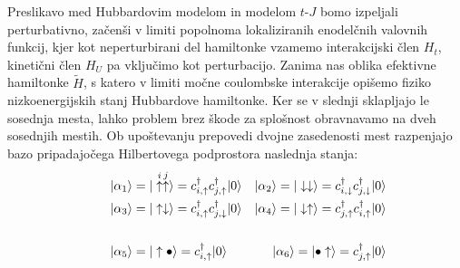 \begin{appendices}
Preslikavo med Hubbardovim modelom in modelom $t$-$J$ bomo izpeljali perturbativno, začenši v limiti popolnoma lokaliziranih enodelčnih valovnih funkcij, kjer kot neperturbirani del hamiltonke vzamemo interakcijski člen $H_t$, kinetični člen $H_U$ pa vključimo kot perturbacijo. Zanima nas oblika efektivne hamiltonke $\tilde{H}$, s katero v limiti močne coulombske interakcije opišemo fiziko nizkoenergijskih stanj Hubbardove hamiltonke. Ker se v slednji sklapljajo le sosednja mesta, lahko problem brez škode za splošnost obravnavamo na dveh sosednjih mestih. Ob upoštevanju prepovedi dvojne zasedenosti mest razpenjajo bazo pripadajočega Hilbertovega podprostora naslednja stanja:
\begin{equation}\label{eq:stanja}
\begin{aligned}\qquad
&\ket{\alpha_1}= \ket{  \overset{i}{\uparrow} \overset{j}{\uparrow}}=c^\dagger_{i,\uparrow}c^\dagger_{j,\uparrow}\ket{0} & \ket{\alpha_2}=\ket{ \downarrow \downarrow}=c^\dagger_{i,\downarrow}c^\dagger_{j,\downarrow}\ket{0}\\
&\ket{\alpha_3}=\ket{ \uparrow \downarrow }=c^\dagger_{i,\uparrow}c^\dagger_{j,\downarrow}\ket{0} &\ket{\alpha_4}=\ket{ \downarrow \uparrow }=c^\dagger_{j,\uparrow}c^\dagger_{i,\uparrow}\ket{0} \\\\
&\ket{\alpha_5}= \ket{\uparrow \bullet}=c^\dagger_{i,\uparrow}\ket{0} &\ket{\alpha_6}=\ket{ \bullet  \uparrow}=c^\dagger_{j,\uparrow}\ket{0}\\

\end{aligned}
\end{equation}
\end{appendices}
